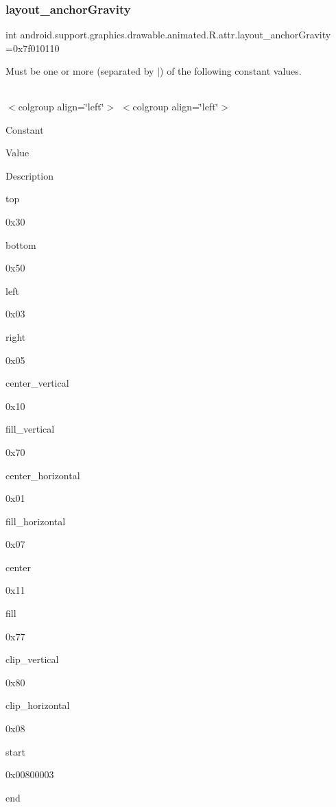 \subsubsection{\texorpdfstring{layout\+\_\+anchor\+Gravity}{layout\_anchorGravity}}
{\footnotesize\ttfamily int android.\+support.\+graphics.\+drawable.\+animated.\+R.\+attr.\+layout\+\_\+anchor\+Gravity =0x7f010110\hspace{0.3cm}{\ttfamily [static]}}

Must be one or more (separated by \textquotesingle{}$\vert$\textquotesingle{}) of the following constant values.

\tabulinesep=1mm
\begin{longtabu} spread 0pt [c]{*{0}{|X[-1]}|}
\hline
\end{longtabu}
$<$colgroup align=\char`\"{}left\char`\"{}$>$ $<$colgroup align=\char`\"{}left\char`\"{}$>$ 

Constant

Value

Description 

{\ttfamily top}

0x30

{\ttfamily bottom}

0x50

{\ttfamily left}

0x03

{\ttfamily right}

0x05

{\ttfamily center\+\_\+vertical}

0x10

{\ttfamily fill\+\_\+vertical}

0x70

{\ttfamily center\+\_\+horizontal}

0x01

{\ttfamily fill\+\_\+horizontal}

0x07

{\ttfamily center}

0x11

{\ttfamily fill}

0x77

{\ttfamily clip\+\_\+vertical}

0x80

{\ttfamily clip\+\_\+horizontal}

0x08

{\ttfamily start}

0x00800003

{\ttfamily end}


